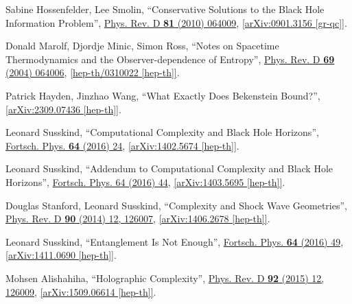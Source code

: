 \documentclass[12pt,preprintnumbers, floatfix, preprintnumbers, letterpaper, superscriptaddress,nofootinbib]{revtex4-2}
\begin{document}
\begin{thebibliography}{99}
Sabine Hossenfelder, Lee Smolin, ``Conservative Solutions to the Black Hole Information Problem'', {\hypersetup{urlcolor=vividviolet}\href{https://journals.aps.org/prd/abstract/10.1103/PhysRevD.81.064009}{Phys. Rev. D \textbf{81} (2010) 064009}}, \href{https://arxiv.org/abs/0901.3156}{[arXiv:0901.3156 [gr-qc]]}.


Donald Marolf, Djordje Minic, Simon Ross, ``Notes on Spacetime Thermodynamics and the Observer-dependence of Entropy'',  {\hypersetup{urlcolor=vividviolet}\href{https://journals.aps.org/prd/abstract/10.1103/PhysRevD.69.064006}{Phys. Rev. D \textbf{69} (2004) 064006}}, \href{https://arxiv.org/abs/hep-th/0310022}{[hep-th/0310022 [hep-th]]}.

Patrick Hayden, Jinzhao Wang, ``What Exactly Does Bekenstein Bound?'', \href{https://arxiv.org/abs/2309.07436}{[arXiv:2309.07436 [hep-th]]}.

Leonard Susskind, ``Computational Complexity and Black Hole Horizons'',  {\hypersetup{urlcolor=vividviolet}\href{https://onlinelibrary.wiley.com/doi/10.1002/prop.201500092}{Fortsch. Phys. \textbf{64} (2016) 24}},  \href{https://arxiv.org/abs/1402.5674}{[arXiv:1402.5674 [hep-th]]}.

Leonard Susskind, ``Addendum to Computational Complexity and Black Hole Horizons'',  {\hypersetup{urlcolor=vividviolet}\href{https://onlinelibrary.wiley.com/doi/10.1002/prop.201500093}{Fortsch. Phys. 64 (2016) 44}}, \href{https://arxiv.org/abs/1403.5695}{[arXiv:1403.5695 [hep-th]]}.

Douglas Stanford, Leonard Susskind, ``Complexity and Shock Wave Geometries'', {\hypersetup{urlcolor=vividviolet}\href{https://journals.aps.org/prd/abstract/10.1103/PhysRevD.90.126007}{Phys. Rev. D \textbf{90} (2014) 12, 126007}}, \href{https://arxiv.org/abs/1406.2678}{[arXiv:1406.2678 [hep-th]]}.


Leonard Susskind, ``Entanglement Is Not Enough'', {\hypersetup{urlcolor=vividviolet}\href{https://onlinelibrary.wiley.com/doi/10.1002/prop.201500095}{Fortsch. Phys. \textbf{64} (2016) 49}}, \href{https://arxiv.org/abs/1411.0690}{[arXiv:1411.0690 [hep-th]]}.

Mohsen Alishahiha, ``Holographic Complexity'', {\hypersetup{urlcolor=vividviolet}\href{https://journals.aps.org/prd/abstract/10.1103/PhysRevD.92.126009}{Phys. Rev. D \textbf{92} (2015) 12, 126009}}, \href{https://arxiv.org/abs/1509.06614}{[arXiv:1509.06614 [hep-th]]}.


\end{thebibliography}
\end{document}
